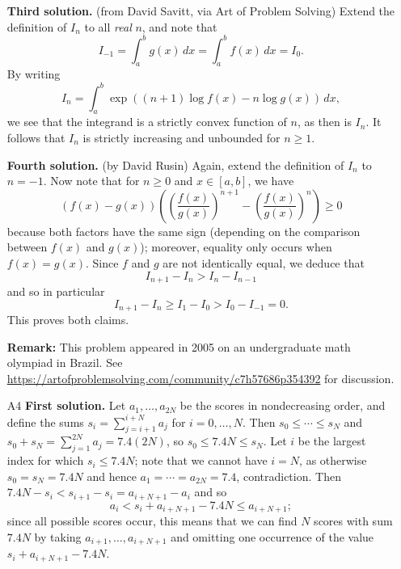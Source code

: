 \documentclass[amssymb,twocolumn,pra,10pt,aps]{revtex4-1}
\begin{document}
\begin{itemize}

\textbf{Third solution.}
(from David Savitt, via Art of Problem Solving)
Extend the definition of $I_n$ to all \emph{real} $n$,
and note that 
\[
I_{-1} = \int_a^b g(x)\,dx = \int_a^b f(x)\,dx = I_0.
\]
By writing
\[
I_n = \int_a^b \exp((n+1)\log f(x) - n \log g(x))\,dx,
\]
we see that the integrand is a strictly convex function of $n$, as then is $I_n$.
It follows that $I_n$ is strictly increasing and unbounded for $n \geq 1$.

\textbf{Fourth solution.}
(by David Rusin)
Again, extend the definition of $I_n$ to $n=-1$.
Now note that for $n \geq 0$ and $x \in [a,b]$, we have
\[
(f(x) - g(x)) \left( \left( \frac{f(x)}{g(x)} \right)^{n+1}  - \left( \frac{f(x)}{g(x)} \right)^{n}  \right) \geq 0
\]
because both factors have the same sign (depending on the comparison between $f(x)$ and $g(x)$);
moreover, equality only occurs when $f(x) = g(x)$. Since $f$ and $g$ are not identically equal, we deduce that
\[
I_{n+1} - I_n > I_n - I_{n-1}
\]
and so in particular
\[
I_{n+1} - I_n \geq I_1 - I_0 > I_0 - I_{-1} = 0.
\]
This proves both claims.

\textbf{Remark:}
This problem appeared in 2005 on an undergraduate math olympiad in Brazil.
See \url{https://artofproblemsolving.com/community/c7h57686p354392} for discussion.

\item[A4]
\textbf{First solution.}
Let $a_1,\dots,a_{2N}$ be the scores in nondecreasing order, and define the sums
$s_i = \sum_{j=i+1}^{i+N} a_j$ for $i=0,\dots,N$.
Then $s_0 \leq \cdots \leq s_{N}$
and
$s_0 + s_{N} = \sum_{j=1}^{2N} a_j = 7.4(2N)$,
so $s_0 \leq 7.4N \leq s_N$. Let $i$ be the largest index for which $s_i \leq 7.4N$;
note that we cannot have $i = N$, as otherwise $s_0 = s_N = 7.4N$ and hence 
$a_1 = \cdots = a_{2N} = 7.4$, contradiction.
Then $7.4N - s_i < s_{i+1} - s_i = a_{i+N+1} - a_i$ and so
\[
a_i < s_i + a_{i+N+1} - 7.4N \leq a_{i+N+1};
\]
since all possible scores occur, this means that we can find $N$ scores with sum $7.4N$
by taking $a_{i+1}, \dots, a_{i+N+1}$ and omitting one occurrence of the value $s_i + a_{i+N+1} - 7.4N$.


\end{itemize}
\end{document}
